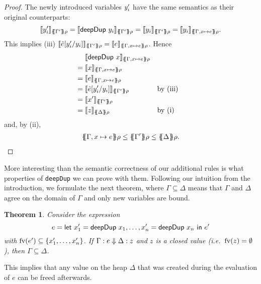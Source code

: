 \documentclass[preprint]{sigplanconf}
\newtheorem{theorem}{Theorem}
\theoremstyle{nonumberplain}
\newtheorem{proof}{Proof}
\newcommand{\li}{\lstinline[style=Haskell]}
\begin{document}
\begin{proof}
The newly introduced variables $y'_i$ have the same semantics as their original counterparts:
\[
\dsem{\fresh y_i}{\esem{\Gamma'}\rho}
= \dsem{\sDeepDup {y_i}}{\esem{\Gamma'}\rho}
= \dsem{y_i}{\esem{\Gamma'}\rho}
= \dsem{y_i}{\esem{\Gamma, x\mapsto e}\rho}.
\]
This implies (iii) $\dsem{\hat e[\fresh y_i/y_i]}{\esem{\Gamma'}\rho} = \dsem{e}{\esem{\Gamma, x\mapsto e}\rho}$. Hence
\begin{align*}
&\phantom{{}={}}\dsem{\sDeepDup x}{\esem{\Gamma, x\mapsto e}\rho}\\
&= \dsem{x}{\esem{\Gamma, x\mapsto e}\rho}\\
&= \dsem{e}{\esem{\Gamma, x\mapsto e}\rho}\\
&= \dsem{\hat e[\fresh y_i/y_i]}{\esem{\Gamma'}\rho} &&\text{by (iii)}\\
&= \dsem{\fresh x}{\esem{\Gamma'}\rho}\\
&= \dsem{z}{\esem \Delta \rho} &&\text{by (i)}
\end{align*}
and, by (ii),
\begin{align*}
\esem{\Gamma, x\mapsto e}\rho \le \esem{\Gamma'} \rho \le \esem{\Delta}\rho.
\end{align*}
\end{proof}

More interesting than the semantic correctness of our additional rules is what properties of \li-deepDup- we can prove with them. Following our intuition from the introduction, we formulate the next theorem, where $\Gamma \subseteq \Delta$ means that $\Gamma$ and $\Delta$ agree on the domain of $\Gamma$ and only new variables are bound.

\begin{theorem}
Consider the expression
\[
e=\text{\textsf{let}}\ x_1' = \text{\textsf{deepDup}}\ x_1,\ldots,x_n'= \text{\textsf{deepDup}}\ x_n\ \text{\textsf{in}}\ e'
\]
with $\text{fv}(e') \subseteq \{x_1',\ldots,x_n'\}$. If $\Gamma : e \Downarrow \Delta : z$ and $z$ is a closed value (i.e.\ $\text{fv}(z) = \emptyset$), then $\Gamma \subseteq \Delta$.
\label{thm:deepdup}
\end{theorem}
This implies that any value on the heap $\Delta$ that was created during the evaluation of $e$ can be freed afterwards.
\end{document}
